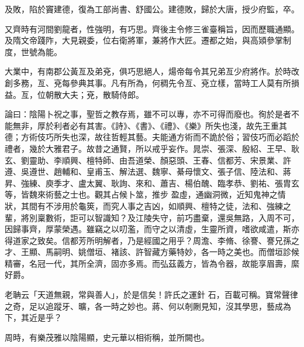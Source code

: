\begin{pinyinscope}
 及敗，陷於竇建德，復為工部尚書、舒國公。建德敗，歸於大唐，授少府監，卒。



 又齊時有河間劉龍者，性強明，有巧思。齊後主令修三雀臺稱旨，因而歷職通顯。及隋文帝踐阼，大見親委，位右衛將軍，兼將作大匠。遷都之始，與高熲參掌制度，世號為能。



 大業中，有南郡公黃亙及弟兗，俱巧思絕人，煬帝每令其兄弟亙少府將作。於時改創多務，亙、兗每參典其事。凡有所為，何稠先令亙、兗立樣，當時工人莫有所損益。亙，位朝散大夫；兗，散騎侍郎。



 論曰：陰陽卜祝之事，聖哲之教存焉，雖不可以專，亦不可得而廢也。徇於是者不能無非，厚於利者必有其害。《詩》、《書》、《禮》、《樂》所失也淺，故先王重其德；方術伎巧所失也深，故往哲輕其藝。夫能通方術而不詭於俗；習伎巧而必蹈於禮者，幾於大雅君子。故昔之通賢，所以戒乎妄作。晁崇、張深、殷紹、王早、耿玄、劉靈助、李順興、檀特師、由吾道榮、顏惡頭、王春、信都芳、宋景業、許遵、吳遵世、趙輔和、皇甫玉、解法選、魏寧、綦母懷文、張子信、陸法和、蔣昇、強練、庾季才、盧太翼、耿詢、來和、蕭吉、楊伯醜、臨孝恭、劉祐、張胄玄等，皆魏來術藝之士也。觀其占候卜筮，推步
 盈虛，通幽洞微，近知鬼神之情狀，其間有不涉用於龜筴，而究人事之吉凶，如順興、檀特之徒，法和、強練之輩，將別稟數術，詎可以智識知？及江陵失守，前巧盡棄，還吳無路，入周不可，因歸事齊，厚蒙榮遇。雖竊之以叨濫，而守之以清虛，生靈所資，嗜欲咸遣，斯亦得道家之致矣。信都芳所明解者，乃是經國之用乎？周澹、李脩、徐謇、謇兄孫之才、王顯、馬嗣明、姚僧垣、褚該、許智藏方藥特妙，各一時之美也。而僧垣診候精審，名冠一代，其所全濟，固亦多焉。而弘茲義方，皆為令器，故能享眉壽，縻好爵。



 老聃云「天道無親，常與善人」，於是信矣！許氏之運針
 石，百載可稱。寶常聲律之奇，足以追蹤牙、曠，各一時之妙也。蔣、何以剞劂見知，沒其學思，藝成為下，其近是乎？



 周時，有樂茂雅以陰陽顯，史元華以相術稱，並所闕也。



\end{pinyinscope}